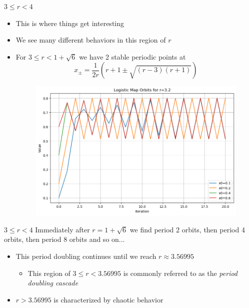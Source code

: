 \documentclass[
	11pt, %
]{beamer}
\begin{document}
\begin{frame}{$3\leq r<4$}
\begin{itemize}
    \item This is where things get interesting
    \item We see many different behaviors in this region of $r$
    \item For $3\leq r<1+\sqrt{6}$ we have 2 stable periodic points at
    \[x_{\pm}=\frac{1}{2r}(r+1\pm\sqrt{(r-3)(r+1)})\]
     	\begin{figure}
	\includegraphics[scale=0.3]{./figures/period2}
	\end{figure}
\end{itemize}
    
\end{frame}
\begin{frame}{$3\leq r<4$}
Immediately after $r=1+\sqrt{6}$ we find period 2 orbits, then period 4 orbits, then period 8 orbits and so on...
\begin{itemize}
\item 
This period doubling continues until we reach $r\approx 3.56995$
\begin{itemize}
    \item This region of $3\leq r< 3.56995$ is commonly referred to as the \emph{period doubling cascade}
\end{itemize}
\item $r>3.56995$ is characterized by chaotic behavior
\end{itemize}
\end{frame}
\end{document}
